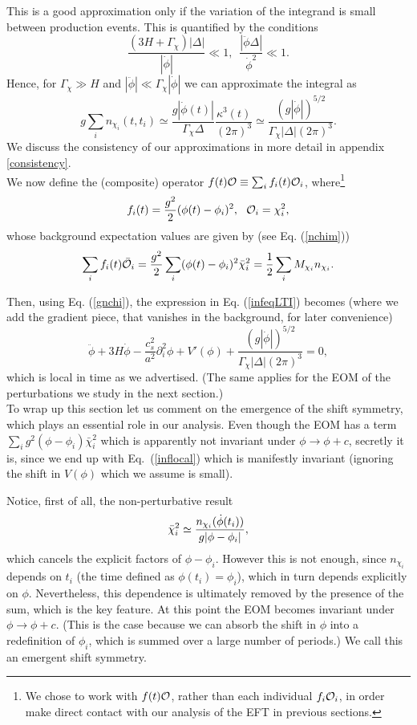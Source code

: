 \documentclass[11pt,amsmath,floats,floatfix,nofootinbib,secnumarabic, superscriptaddress, tightenlines]{revtex4}
\newcommand{\beq}{\begin{equation}}
\newcommand{\eeq}{\end{equation}}
\newcommand{\be}{\begin{equation}}
\newcommand{\ee}{\end{equation}}
\newcommand{\calo}{{\cal O}}
\begin{document}
{This is a good approximation only if the variation of the integrand is small between production events. This is quantified by the conditions
\be\label{c3c4} \frac{ (3H+\Gamma_{\chi})|\Delta|}{|\dot{\phi}|}\ll1,\,\,\,\frac{|\ddot{\phi}\Delta|}{\dot{\phi}^2}\ll1.\ee
Hence, for $\Gamma_{\chi} \gg H$ and $|\ddot{\phi}|\ll\Gamma_{\chi} |\dot{\phi}|$ we can approximate the integral as
\beq
\label{gnchi}
g \sum_i n_{\chi_i}(t,t_i)\simeq \frac{g|\dot{\phi}(t)|}{\Gamma_{\chi}\Delta }\frac{\kappa^3(t)}{(2\pi)^3} \simeq \frac{(g |\dot{\phi}|)^{5/2}}{\Gamma_{\chi}|\Delta|(2\pi)^3}.
\eeq
We discuss the consistency of our approximations in more detail in appendix \ref{consistency}.\\

We now define the (composite) operator $f(t){\calo}\equiv \sum_i f_i(t)\calo_i$, where\footnote{We chose to work with $f(t)\calo$, rather than each individual $f_i\calo_i$, in order make direct contact with our analysis of the EFT in previous sections.} 
\beq
f_i(t) = \frac{g^2}{2}(\phi(t)-\phi_i)^2,~~\calo_i =  \chi^2_i, \eeq
whose background expectation values are given by (see Eq. (\ref{nchim}))
\beq
\sum_i f_i(t)\bar\calo_i = \frac{g^2}{2} \sum_i (\phi(t)-\phi_i)^2\bar\chi_i^2 =  \frac{1}{2}\sum_i M_{\chi_i} n_{\chi_i}.
\eeq

Then, using Eq. (\ref{gnchi}), the expression in Eq. (\ref{infeqLTI}) becomes (where we add the gradient piece, that vanishes in the background, for later convenience) 
\beq
\label{inflocal}\ddot{\phi}+3H\dot{\phi}-\frac{c_s^2}{a^2}\partial_i^2\phi+V'(\phi)+\frac{(g |\dot{\phi}|)^{5/2}}{\Gamma_{\chi}|\Delta|(2\pi)^3}=0,
\eeq
which is local in time as we advertised. (The same applies for the EOM of the perturbations we study in the next section.)\\ 

To wrap up this section let us comment on the emergence of the shift symmetry, which plays an essential role in our analysis. Even though the EOM has a term $\sum_i g^2(\phi-\phi_i)\bar\chi_i^2$ which is apparently not invariant under $\phi \to \phi+c$, secretly it is, since we end up with Eq.~(\ref{inflocal}) which is manifestly invariant (ignoring the shift in $V(\phi)$ which we assume is small).  

Notice, first of all, the non-perturbative result
\beq
\bar\chi_i^2\simeq {n_{\chi_i}(\dot\phi(t_i))\over g|\phi-\phi_i|},
\eeq
which cancels the explicit factors of $\phi-\phi_i$. However this is not enough, since $n_{\chi_i}$ depends on $t_i$ (the time defined as $\phi(t_i)=\phi_i$), which in turn depends explicitly on $\phi$. Nevertheless, this dependence is ultimately removed by the presence of the sum, which is the key feature. At this point the EOM becomes invariant under $\phi \to \phi + c$. (This is the case because we can absorb the shift in $\phi$ into a redefinition of $\phi_i$, which is summed over a large number of periods.) We call this an emergent shift symmetry.

}
\end{document}
